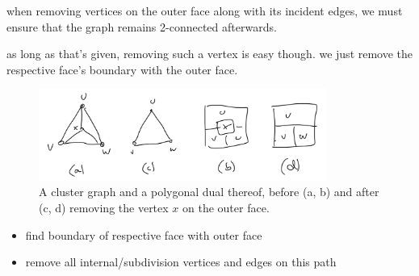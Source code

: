 when removing vertices on the outer face along with its incident edges, we must ensure that the graph remains 2-connected afterwards.

as long as that's given, removing such a vertex is easy though. we just remove the respective face's boundary with the outer face.

\begin{figure}[H]
	\centering
	\includegraphics[height=30mm]{Resources/RemoveInternalVertex.png}
	\caption{A cluster graph and a polygonal dual thereof, before (a, b) and after (c, d) removing the vertex $x$ on the outer face.}
	\label{fig:remove-external-vertex-example}
\end{figure}

\begin{itemize}
	\item find boundary of respective face with outer face
	\item remove all internal/subdivision vertices and edges on this path
\end{itemize}
